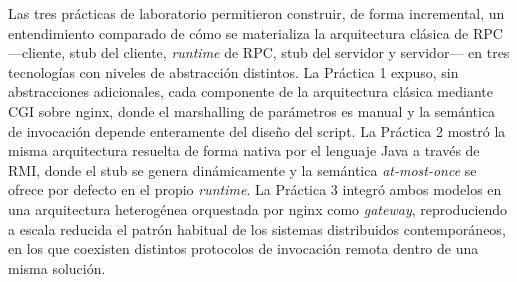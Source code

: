 Las tres prácticas de laboratorio permitieron construir, de forma incremental, un entendimiento comparado de cómo se materializa la arquitectura clásica de RPC —cliente, stub del cliente, \emph{runtime} de RPC, stub del servidor y servidor— en tres tecnologías con niveles de abstracción distintos. La Práctica 1 expuso, sin abstracciones adicionales, cada componente de la arquitectura clásica mediante CGI sobre nginx, donde el marshalling de parámetros es manual y la semántica de invocación depende enteramente del diseño del script. La Práctica 2 mostró la misma arquitectura resuelta de forma nativa por el lenguaje Java a través de RMI, donde el stub se genera dinámicamente y la semántica \emph{at-most-once} se ofrece por defecto en el propio \emph{runtime}. La Práctica 3 integró ambos modelos en una arquitectura heterogénea orquestada por nginx como \emph{gateway}, reproduciendo a escala reducida el patrón habitual de los sistemas distribuidos contemporáneos, en los que coexisten distintos protocolos de invocación remota dentro de una misma solución.
